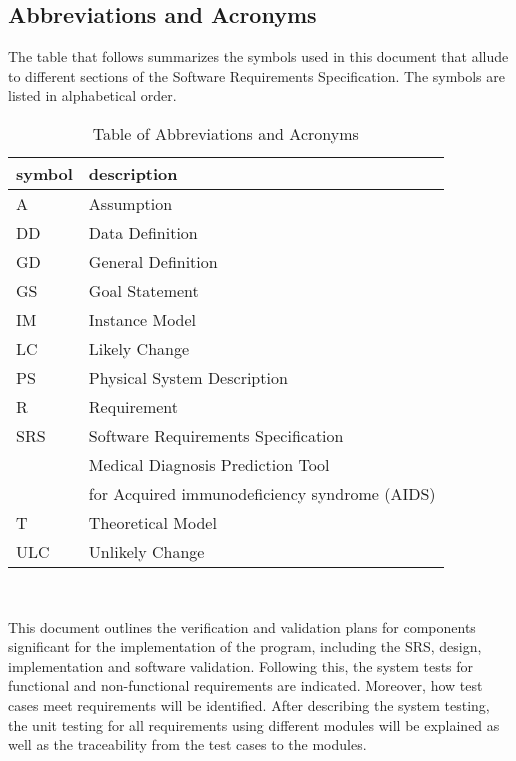 \documentclass[12pt, titlepage]{article}
\begin{document}
\newpage


\subsection{Abbreviations and Acronyms}

The table that follows summarizes the symbols used in this document that allude 
to different sections of the Software Requirements Specification. The symbols 
are listed in alphabetical order.
\begin{table}[ht]
\begin{center}
\renewcommand{\arraystretch}{1.2}
\begin{tabular}{l l} 
  \toprule		
  \textbf{symbol} & \textbf{description}\\
  \midrule 
  A & Assumption\\
  DD & Data Definition\\
  GD & General Definition\\
  GS & Goal Statement\\
  IM & Instance Model\\
  LC & Likely Change\\
  PS & Physical System Description\\
  R & Requirement\\
  SRS & Software Requirements Specification\\
  \progname{} & Medical Diagnosis Prediction Tool \\
   & for Acquired immunodeficiency syndrome (AIDS)\\
  T & Theoretical Model\\
  ULC & Unlikely Change\\
  \bottomrule
\end{tabular}\\
\end{center}
\caption{Table of Abbreviations and Acronyms}

\end{table}

\newpage


This document outlines the verification and validation plans for components 
significant for the implementation of the \progname{} program, including the 
SRS, design, implementation and software validation. Following this, the system 
tests for functional and non-functional requirements are indicated. Moreover, 
how test cases meet requirements will be identified. After describing the system 
testing, the unit testing for all requirements using different modules will be 
explained as well as the traceability from the test cases to the modules.
\end{document}
